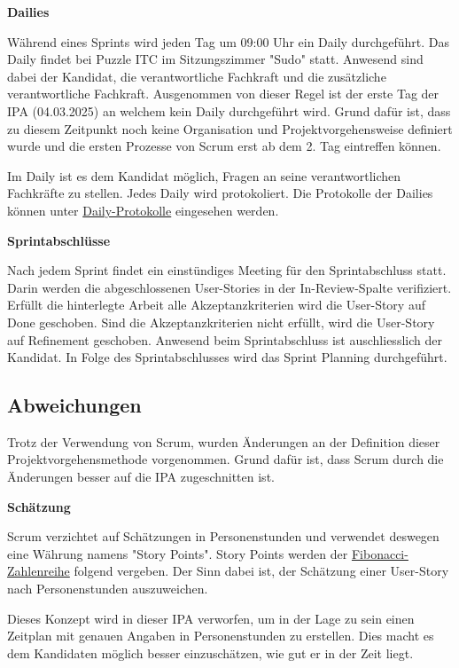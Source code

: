 \textbf{Dailies}

Während eines Sprints wird jeden Tag um 09:00 Uhr ein Daily durchgeführt. Das Daily findet bei Puzzle ITC
im Sitzungszimmer "Sudo" statt. Anwesend sind dabei der Kandidat, die verantwortliche Fachkraft und die zusätzliche verantwortliche
Fachkraft. Ausgenommen von dieser Regel ist der erste Tag der IPA (04.03.2025) an welchem kein Daily durchgeführt wird. Grund dafür ist, dass zu diesem Zeitpunkt noch keine
Organisation und Projektvorgehensweise definiert wurde und die ersten Prozesse von Scrum erst ab dem 2. Tag eintreffen können.

Im Daily ist es dem Kandidat möglich, Fragen an seine verantwortlichen Fachkräfte zu stellen. Jedes Daily wird protokoliert. 
Die Protokolle der Dailies können unter \hyperref[sec:dailyprot]{Daily-Protokolle} eingesehen werden.

\textbf{Sprintabschlüsse}
\label{sprintfinish}

Nach jedem Sprint findet ein einstündiges Meeting für den Sprintabschluss statt. Darin werden die abgeschlossenen User-Stories
in der In-Review-Spalte verifiziert. Erfüllt die hinterlegte Arbeit alle Akzeptanzkriterien wird die User-Story auf Done geschoben. 
Sind die Akzeptanzkriterien nicht erfüllt, wird die User-Story auf Refinement geschoben. Anwesend beim Sprintabschluss ist auschliesslich der Kandidat.
In Folge des Sprintabschlusses wird das Sprint Planning durchgeführt.

\subsection{Abweichungen}
Trotz der Verwendung von Scrum, wurden Änderungen an der Definition dieser Projektvorgehensmethode
vorgenommen. Grund dafür ist, dass Scrum durch die Änderungen besser auf die IPA zugeschnitten ist.

\textbf{Schätzung}

Scrum verzichtet auf Schätzungen in Personenstunden und verwendet deswegen eine Währung namens "Story Points". Story Points werden
der \href{https://de.wikipedia.org/wiki/Fibonacci-Folge}{Fibonacci-Zahlenreihe} folgend vergeben. Der Sinn dabei ist, der Schätzung einer User-Story 
nach Personenstunden auszuweichen.

Dieses Konzept wird in dieser IPA verworfen, um in der Lage zu sein einen Zeitplan mit genauen Angaben in Personenstunden zu erstellen. Dies macht es dem Kandidaten
möglich besser einzuschätzen, wie gut er in der Zeit liegt.


